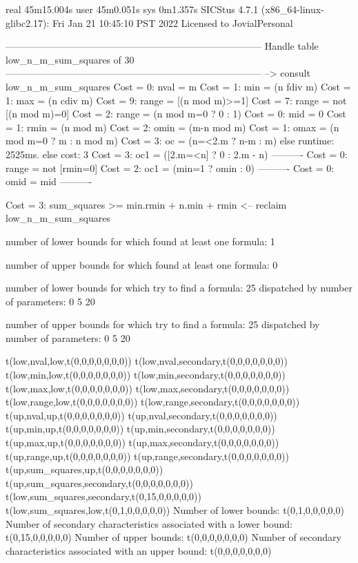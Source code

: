 real	45m15.004s
user	45m0.051s
sys	0m1.357s
SICStus 4.7.1 (x86_64-linux-glibc2.17): Fri Jan 21 10:45:10 PST 2022
Licensed to JovialPersonal


--------------------------------------------------------------------------------
Handle table low_n_m_sum_squares of 30
--------------------------------------------------------------------------------
--> consult low_n_m_sum_squares
Cost =  0:  nval  = m
Cost =  1:  min   = (n fdiv m)
Cost =  1:  max   = (n cdiv m)
Cost =  9:  range = [(n mod m)>=1]
Cost =  7:  range = not [(n mod m)=0]
Cost =  2:  range = (n mod m=0 ? 0 : 1)
Cost =  0:  mid   = 0
Cost =  1:  rmin  = (n mod m)
Cost =  2:  omin  = (m-n mod m)
Cost =  1:  omax  = (n mod m=0 ? m : n mod m)
Cost =  3:  oc    = (n=<2.m ? n-m : m)
else runtime: 2525ms. else cost: 3
Cost =  3:  oc1   = ([2.m=<n] ? 0 : 2.m - n) %
----------
Cost =  0:  range = not [rmin=0]
Cost =  2:  oc1   = (min=1 ? omin : 0)
----------
Cost =  0:  omid  = mid
----------

Cost =  3:  sum_squares >= min.rmin + n.min + rmin
<-- reclaim low_n_m_sum_squares

number of lower bounds for which found at least one formula: 1

number of upper bounds for which found at least one formula: 0

number of lower bounds for which try to find a formula: 25
dispatched by number of parameters: 0  5  20

number of upper bounds for which try to find a formula: 25
dispatched by number of parameters: 0  5  20

t(low,nval,low,t(0,0,0,0,0,0,0))
t(low,nval,secondary,t(0,0,0,0,0,0,0))
t(low,min,low,t(0,0,0,0,0,0,0))
t(low,min,secondary,t(0,0,0,0,0,0,0))
t(low,max,low,t(0,0,0,0,0,0,0))
t(low,max,secondary,t(0,0,0,0,0,0,0))
t(low,range,low,t(0,0,0,0,0,0,0))
t(low,range,secondary,t(0,0,0,0,0,0,0))
t(up,nval,up,t(0,0,0,0,0,0,0))
t(up,nval,secondary,t(0,0,0,0,0,0,0))
t(up,min,up,t(0,0,0,0,0,0,0))
t(up,min,secondary,t(0,0,0,0,0,0,0))
t(up,max,up,t(0,0,0,0,0,0,0))
t(up,max,secondary,t(0,0,0,0,0,0,0))
t(up,range,up,t(0,0,0,0,0,0,0))
t(up,range,secondary,t(0,0,0,0,0,0,0))
t(up,sum_squares,up,t(0,0,0,0,0,0,0))
t(up,sum_squares,secondary,t(0,0,0,0,0,0,0))
t(low,sum_squares,secondary,t(0,15,0,0,0,0,0))
t(low,sum_squares,low,t(0,1,0,0,0,0,0))
Number of lower bounds:                                             t(0,1,0,0,0,0,0)
Number of secondary characteristics associated with a lower bound:  t(0,15,0,0,0,0,0)
Number of upper bounds:                                             t(0,0,0,0,0,0,0)
Number of secondary characteristics associated with an upper bound: t(0,0,0,0,0,0,0)

